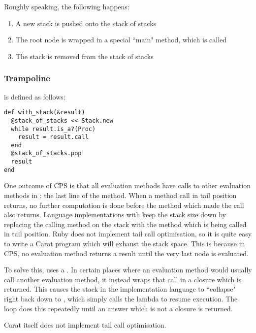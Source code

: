 Roughly speaking, the following happens:

\begin{enumerate}
  \item A new stack is pushed onto the stack of stacks
  \item The root node is wrapped in a special ``main" method, which is called
  \item The stack is removed from the stack of stacks
\end{enumerate}

\subsubsection{Trampoline}

 is defined as follows:

\begin{minipage}{\textwidth}
\begin{lstlisting}
def with_stack(&result)
  @stack_of_stacks << Stack.new
  while result.is_a?(Proc)
    result = result.call
  end
  @stack_of_stacks.pop
  result
end
\end{lstlisting}
\end{minipage}

One outcome of CPS is that all evaluation methods have calls to other evaluation methods in : the last line of the method. When a method call in tail position returns, no further computation is done before the method which made the call also returns. Language implementations with  keep the stack size down by replacing the calling method on the stack with the method which is being called in tail position. Ruby does not implement tail call optimisation, so it is quite easy to write a Carat program which will exhaust the stack space. This is because in CPS, no evaluation method returns a result until the very last node is evaluated.

To solve this,  uses a . In certain places where an evaluation method would usually call another evaluation method, it instead wraps that call in a closure which is returned. This causes the stack in the implementation language to ``collapse" right back down to , which simply calls the lambda to resume execution. The  loop does this repeatedly until an answer which is not a closure is returned.

Carat itself does not implement tail call optimisation.

